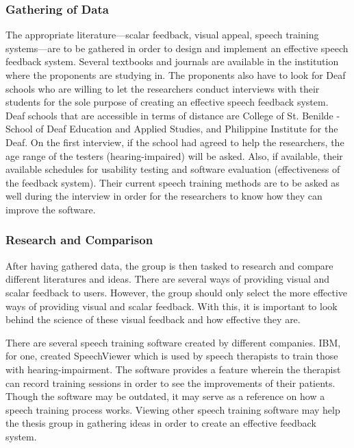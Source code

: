 \subsubsection{Gathering of Data}
The appropriate literature---scalar feedback, visual appeal, speech training systems---are to be gathered in order to design and implement an effective speech feedback system. Several textbooks and journals are available in the institution where the proponents are studying in. The proponents also have to look for Deaf schools who are willing to let the researchers conduct interviews with their students for the sole purpose of creating an effective speech feedback system. Deaf schools that are accessible in terms of distance are College of St. Benilde - School of Deaf Education and Applied Studies, and Philippine Institute for the Deaf. On the first interview, if the school had agreed to help the researchers, the age range of the testers (hearing-impaired) will be asked. Also, if available, their available schedules for usability testing and software evaluation (effectiveness of the feedback system). Their current speech training methods are to be asked as well during the interview in order for the researchers to know how they can improve the software.

\subsubsection{Research and Comparison}
After having gathered data, the group is then tasked to research and compare different literatures and ideas. There are several ways of providing visual and scalar feedback to users. However, the group should only select the more effective ways of providing visual and scalar feedback. With this, it is important to look behind the science of these visual feedback and how effective they are.

There are several speech training software created by different companies. IBM, for one, created SpeechViewer which is used by speech therapists to train those with hearing-impairment. The software provides a feature wherein the therapist can record training sessions in order to see the improvements of their patients. Though the software may be outdated, it may serve as a reference on how a speech training process works. Viewing other speech training software may help the thesis group in gathering ideas in order to create an effective feedback system.

